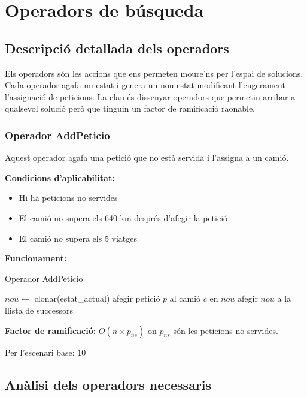 \section{Operadors de búsqueda}
\label{sec:operators}

\subsection{Descripció detallada dels operadors}

Els operadors són les accions que ens permeten moure'ns per l'espai de solucions. Cada operador agafa un estat i genera un nou estat modificant lleugerament l'assignació de peticions. La clau és dissenyar operadors que permetin arribar a qualsevol solució però que tinguin un factor de ramificació raonable.

\subsubsection{Operador AddPeticio}

Aquest operador agafa una petició que no està servida i l'assigna a un camió.

\textbf{Condicions d'aplicabilitat:}
\begin{itemize}
    \item Hi ha peticions no servides
    \item El camió no supera els 640 km després d'afegir la petició
    \item El camió no supera els 5 viatges
\end{itemize}

\textbf{Funcionament:}
\begin{algorithm}[H]
\caption{Operador AddPeticio}
\begin{algorithmic}[1]
        \State $nou \gets$ clonar(estat\_actual)
        \State afegir petició $p$ al camió $c$ en $nou$
            \State afegir $nou$ a la llista de successors
        \EndIf
    \EndFor
\EndFor
\end{algorithmic}
\end{algorithm}

\textbf{Factor de ramificació:} $O(n \times p_{ns})$ on $p_{ns}$ són les peticions no servides.

Per l'escenari base: $10$ 

\subsection{Anàlisi dels operadors necessaris}

